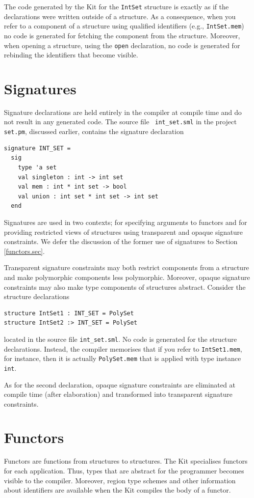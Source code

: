 \documentclass[12pt]{book}
\begin{document}
\noindent
The code generated by the Kit for the {\tt IntSet} structure is
exactly as if the declarations were written outside of a structure.
As a consequence, when you refer to a component of a structure using
qualified identifiers (e.g., {\tt IntSet.mem}) no code is generated
for fetching the component from the structure. Moreover, when opening
a structure, using the {\tt open} declaration, no code is generated
for rebinding the identifiers that become visible.

\section{Signatures}
Signature declarations are held entirely in the compiler at compile
time and do not result in any generated code. The source file {\tt
int\_set.sml} in the project {\tt set.pm}, discussed earlier, contains
the signature declaration
\begin{verbatim}
signature INT_SET =
  sig
    type 'a set
    val singleton : int -> int set
    val mem : int * int set -> bool
    val union : int set * int set -> int set
  end
\end{verbatim}

\noindent
Signatures are used in two contexts; for specifying arguments to
functors and for providing restricted views of structures using
transparent and opaque signature constraints. We defer the discussion
of the former use of signatures to Section \ref{functors.sec}.

Transparent signature constraints may both restrict components from a
structure and make polymorphic components less polymorphic. Moreover,
opaque signature constraints may also make type components of
structures abstract. Consider the structure declarations
\begin{verbatim}
structure IntSet1 : INT_SET = PolySet
structure IntSet2 :> INT_SET = PolySet
\end{verbatim}

\noindent
located in the source file {\tt int\_set.sml}. No code is generated
for the structure declarations. Instead, the compiler memorises that
if you refer to {\tt IntSet1.mem}, for instance, then it is actually
{\tt PolySet.mem} that is applied with type instance {\tt int}.

As for the second declaration, opaque signature constraints are
eliminated at compile time (after elaboration) and transformed into
transparent signature constraints.

\section{Functors \label{functors.sec}}
Functors are functions from structures to structures. The Kit
specialises functors for each application. Thus, types that are
abstract for the programmer becomes visible to the compiler.
Moreover, region type schemes and other information about identifiers
are available when the Kit compiles the body of a functor.
\end{document}
